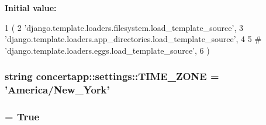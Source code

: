 \label{namespaceconcertapp_1_1settings_aa9c92e85f76082a6f35d9634e5a0ed1d}
{\bfseries Initial value:}
\begin{DoxyCode}
1 (
2     'django.template.loaders.filesystem.load_template_source',
3     'django.template.loaders.app_directories.load_template_source',
4 
5 #     'django.template.loaders.eggs.load_template_source',
6 )
\end{DoxyCode}
\hypertarget{namespaceconcertapp_1_1settings_a512e2a904213044a63a0ff25c00c99c0}{
\subsubsection[{TIME\_\-ZONE}]{\setlength{\rightskip}{0pt plus 5cm}string {\bf concertapp::settings::TIME\_\-ZONE} = 'America/New\_\-York'}}
\label{namespaceconcertapp_1_1settings_a512e2a904213044a63a0ff25c00c99c0}
\hypertarget{namespaceconcertapp_1_1settings_af0ee3cb7218c9b148cd422dc8c9baf62}{
\subsubsection[{USE\_\-I18N}]{ = True}}
\label{namespaceconcertapp_1_1settings_af0ee3cb7218c9b148cd422dc8c9baf62}
